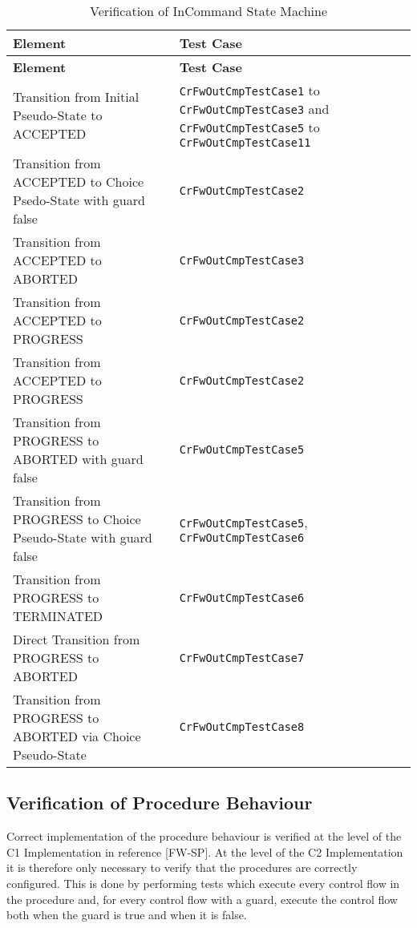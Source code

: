 \documentclass{pnp_article}
\begin{document}
\begin{longtable}{|>{\raggedright}p{8.0cm}|P{5.0cm}|}
\caption{Verification of InCommand State Machine}
\label{tab:verInCmdSM}\\
\hline
{}
\textbf{Element} & \textbf{Test Case} \\
\hline
\endfirsthead
{}
\textbf{Element} & \textbf{Test Case} \\
\hline
\endhead
Transition from Initial Pseudo-State to ACCEPTED  & \texttt{CrFwOutCmpTestCase1} to \texttt{CrFwOutCmpTestCase3} and \texttt{CrFwOutCmpTestCase5} to \texttt{CrFwOutCmpTestCase11} \\
\hline
Transition from ACCEPTED to Choice Psedo-State with guard false & \texttt{CrFwOutCmpTestCase2}\\
\hline
Transition from ACCEPTED to ABORTED & \texttt{CrFwOutCmpTestCase3}\\
\hline
Transition from ACCEPTED to PROGRESS & \texttt{CrFwOutCmpTestCase2}\\
\hline
Transition from ACCEPTED to PROGRESS & \texttt{CrFwOutCmpTestCase2}\\
\hline
Transition from PROGRESS to ABORTED with guard false & \texttt{CrFwOutCmpTestCase5}\\
\hline
Transition from PROGRESS to Choice Pseudo-State with guard false & \texttt{CrFwOutCmpTestCase5}, \texttt{CrFwOutCmpTestCase6}\\
\hline
Transition from PROGRESS to TERMINATED & \texttt{CrFwOutCmpTestCase6}\\
\hline
Direct Transition from PROGRESS to ABORTED & \texttt{CrFwOutCmpTestCase7}\\
\hline
Transition from PROGRESS to ABORTED via Choice Pseudo-State & \texttt{CrFwOutCmpTestCase8}\\
\hline
\end{longtable}

\subsection{Verification of Procedure Behaviour}
Correct implementation of the procedure behaviour is verified at the level of the C1 Implementation in reference [FW-SP]. At the level of the C2 Implementation it is therefore only necessary to verify that the procedures are correctly configured. This is done by performing tests which execute every control flow in the procedure and, for every control flow with a guard, execute the control flow both when the guard is true and when it is false.
\end{document}
